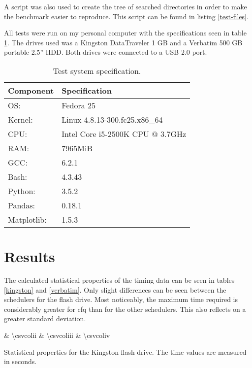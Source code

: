 \documentclass[12pt, a4paper]{article} %
\begin{document}
A script was also used to create the tree of searched directories in order to make the benchmark easier to reproduce.
This script can be found in listing \ref{test-files}.

All tests were run on my personal computer with the specifications seen in table \ref{spec}.
The drives used was a Kingston DataTraveler 1 GB and a Verbatim 500 GB portable 2.5'' HDD.
Both drives were connected to a USB 2.0 port.

\begin{table}[ht]
	\centering
	\begin{tabular}{ll}
		\toprule
		Component & Specification \\
		\midrule
		OS: & Fedora 25 \\
		Kernel: & Linux 4.8.13-300.fc25.x86\_64 \\
		CPU: & Intel Core i5-2500K CPU @ 3.7GHz \\
		RAM: & 7965MiB \\
		GCC: & 6.2.1 \\
		Bash: & 4.3.43 \\
		Python: & 3.5.2 \\
		Pandas: & 0.18.1 \\
		Matplotlib: & 1.5.3 \\
		\hline
	\end{tabular}
	\caption{Test system specification.}
	\label{spec}
\end{table}

\section{Results}

The calculated statistical properties of the timing data can be seen in tables \ref{kingston} and \ref{verbatim}.
Only slight differences can be seen between the schedulers for the flash drive.
Most noticeably, the maximum time required is considerably greater for cfq than for the other schedulers.
This also reflects on a greater standard deviation.

\begin{table}[ht]
	\centering
	{\csvcoli & \num{\csvcolii} & \num{\csvcoliii} & \num{\csvcoliv}}
	\caption{Statistical properties for the Kingston flash drive. The time values are measured in seconds.}
	\label{kingston}
\end{table}
\end{document}
